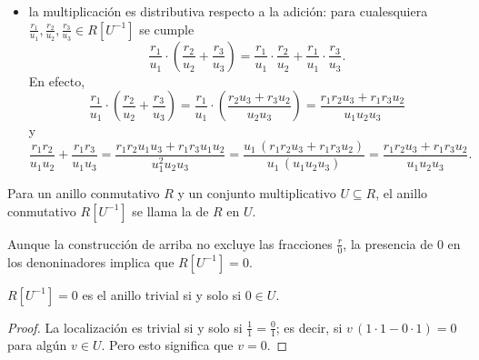 \begin{construccion}
\begin{enumerate}
\begin{itemize}
    \item la multiplicación es distributiva respecto a la adición: para
      cualesquiera
      $\frac{r_1}{u_1},\frac{r_2}{u_2},\frac{r_3}{u_3}\in R [U^{-1}]$ se cumple
      \[ \frac{r_1}{u_1}\cdot\left(\frac{r_2}{u_2}+\frac{r_3}{u_3}\right) =
         \frac{r_1}{u_1}\cdot\frac{r_2}{u_2} + \frac{r_1}{u_1}\cdot\frac{r_3}{u_3}. \]
      En efecto,
      \[ \frac{r_1}{u_1}\cdot \left(\frac{r_2}{u_2}+\frac{r_3}{u_3}\right) =
         \frac{r_1}{u_1}\cdot \left(\frac{r_2 u_3 + r_3 u_2}{u_2 u_3}\right) =
         \frac{r_1 r_2 u_3 + r_1 r_3 u_2}{u_1 u_2 u_3} \]
      y
      \[ \frac{r_1 r_2}{u_1 u_2} + \frac{r_1 r_3}{u_1 u_3} =
         \frac{r_1 r_2 u_1 u_3 + r_1 r_3 u_1 u_2}{u_1^2 u_2 u_3} =
         \frac{u_1 \, (r_1 r_2 u_3 + r_1 r_3 u_2)}{u_1\, (u_1 u_2 u_3)} =
         \frac{r_1 r_2 u_3 + r_1 r_3 u_2}{u_1 u_2 u_3}. \]
    \end{itemize}
  \end{enumerate}
\end{construccion}

\begin{definicion}
  Para un anillo conmutativo $R$ y un conjunto multiplicativo $U \subseteq R$,
  el anillo conmutativo $R [U^{-1}]$ se llama la
   de $R$ en $U$.
\end{definicion}

Aunque la construcción de arriba no excluye las fracciones $\frac{r}{0}$,
la presencia de $0$ en los denoninadores implica que $R [U^{-1}] = 0$.

\begin{observacion}
  \label{obs:localizacion-es-trivial}
  $R [U^{-1}] = 0$ es el anillo trivial si y solo si $0 \in U$.

  \begin{proof}
    La localización es trivial si y solo si $\frac{1}{1} = \frac{0}{1}$;
    es decir, si $v\,(1\cdot 1 - 0\cdot 1) = 0$ para algún $v \in U$. Pero esto
    significa que $v = 0$.
  \end{proof}
\end{observacion}

